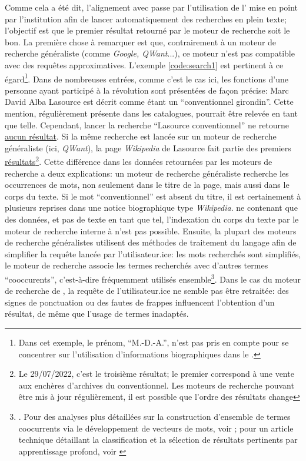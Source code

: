 Comme cela a été dit, l'alignement avec \wkd{} passe par l'utilisation de l'\api{} mise en point par l'institution afin de lancer automatiquement des recherches en plein texte; l'objectif est que le premier résultat retourné par le moteur de recherche soit le bon. La première chose à remarquer est que, contrairement à un moteur de recherche généraliste (comme \textit{Google, QWant}...), ce moteur n'est pas compatible avec des requêtes approximatives. L'exemple \ref{code:search1} est pertinent à ce égard\footnote{Dans cet exemple, le prénom, \enquote{M.-D.-A.}, n'est pas pris en compte pour se concentrer sur l'utilisation d'informations biographiques dans le \ttrait{}.}. Dans de nombreuses entrées, comme c'est le cas ici, les fonctions d'une personne ayant participé à la révolution sont présentées de façon précise: Marc David Alba Lasource est décrit comme étant un \enquote{conventionnel girondin}. Cette mention, régulièrement présente dans les catalogues, pourrait être relevée en tant que telle. Cependant, lancer la recherche \enquote{Lasource conventionnel} ne retourne \href{https://www.wikidata.org/w/index.php?search=lasource+conventionnel&title=Special:Search&profile=advanced&fulltext=1&ns0=1&ns120=1}{aucun résultat}. Si la même recherche est lancée sur un moteur de recherche généraliste (ici, \textit{QWant}), la page \textit{Wikipedia} de Lasource fait partie des premiers \href{https://www.qwant.com/?q=lasource+conventionnel}{résultats}\footnote{Le 29/07/2022, c'est le troisième résultat; le premier correspond à une vente aux enchères d'archives du conventionnel. Les moteurs de recherche pouvant être mis à jour régulièrement, il est possible que l'ordre des résultats change}. Cette différence dans les données retournées par les moteurs de recherche a deux explications: un moteur de recherche généraliste recherche les occurrences de mots, non seulement dans le titre de la page, mais aussi dans le corps du texte. Si le mot \enquote{conventionnel} est absent du titre, il est certainement à plusieurs reprises dans une notice biographique type \textit{Wikipedia}. \wkd{} ne contenant que des données, et pas de texte en tant que tel, l'indexation du corps du texte par le moteur de recherche interne à \wkd{} n'est pas possible. Ensuite, la plupart des moteurs de recherche généralistes utilisent des méthodes de traitement du langage afin de simplifier la requête lancée par l'utilisateur.ice: les mots recherchés sont simplifiés, le moteur de recherche associe les termes recherchés avec d'autres termes \enquote{cooccurents}, c'est-à-dire fréquemment utilisés ensemble\footnote{\cite{noauthor_moteur_2022}. Pour des analyses plus détaillées sur la construction d'ensemble de termes coocurrents via le développement de vecteurs de mots, voir \cite{mikolov_efficient_2013}; pour un article technique détaillant la classification et la sélection de résultats pertinents par apprentissage profond, voir \cite{covington_deep_2016}}. Dans le cas du moteur de recherche de \wkd{}, la requête de l'utilisateur.ice ne semble pas être retraitée: des signes de ponctuation ou des fautes de frappes influencent l'obtention d'un résultat, de même que l'usage de termes inadaptés.

